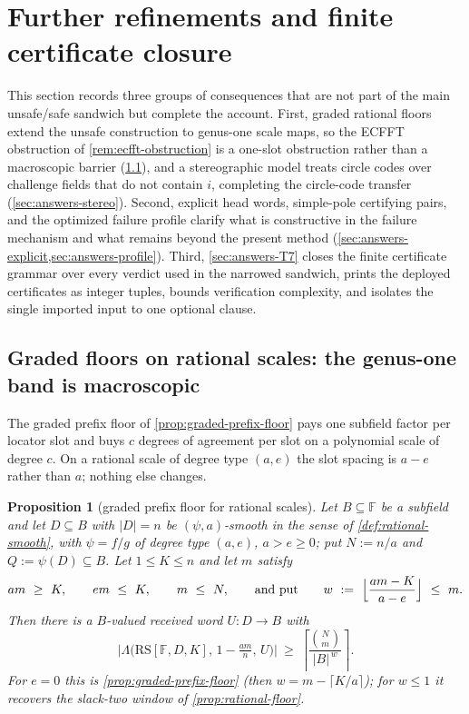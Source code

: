 \documentclass[11pt]{article}
\newtheorem{proposition}[proposition]{Proposition}
\theoremstyle{definition}
\theoremstyle{remark}
\newcommand{\F}{\mathbb{F}}
\newcommand{\B}{B}
\newcommand{\RS}{\mathrm{RS}}
\newcommand{\Lst}{\Lambda}
\begin{document}
\section{Further refinements and finite certificate closure}\label{sec:answers}

This section records three groups of consequences that are not part of the main unsafe/safe sandwich but complete the account.  First, graded rational floors extend the unsafe construction to genus-one scale maps, so the ECFFT obstruction of \cref{rem:ecfft-obstruction} is a one-slot obstruction rather than a macroscopic barrier (\cref{sec:answers-isogeny}), and a stereographic model treats circle codes over challenge fields that do not contain $i$, completing the circle-code transfer (\cref{sec:answers-stereo}).  Second, explicit head words, simple-pole certifying pairs, and the optimized failure profile clarify what is constructive in the failure mechanism and what remains beyond the present method (\cref{sec:answers-explicit,sec:answers-profile}).  Third, \cref{sec:answers-T7} closes the finite certificate grammar over every verdict used in the narrowed sandwich, prints the deployed certificates as integer tuples, bounds verification complexity, and isolates the single imported input to one optional clause.

\subsection{Graded floors on rational scales: the genus-one band is macroscopic}\label{sec:answers-isogeny}

The graded prefix floor of \cref{prop:graded-prefix-floor} pays one subfield factor per locator slot and buys $c$ degrees of agreement per slot on a polynomial scale of degree $c$. On a rational scale of degree type $(a,e)$ the slot spacing is $a-e$ rather than $a$; nothing else changes.

\begin{proposition}[graded prefix floor for rational scales]\label{prop:graded-rational-floor}
Let $\B\subseteq\F$ be a subfield and let $D\subseteq\B$ with $|D|=n$ be $(\psi,a)$-smooth in the sense of \cref{def:rational-smooth}, with $\psi=f/g$ of degree type $(a,e)$, $a>e\ge0$; put $N:=n/a$ and $Q:=\psi(D)\subseteq\B$. Let $1\le K\le n$ and let $m$ satisfy
\[
am\ \ge\ K,\qquad em\ \le\ K,\qquad m\ \le\ N,
\qquad\text{and put}\qquad
w\ :=\ \Bigl\lfloor\frac{am-K}{a-e}\Bigr\rfloor\ \le\ m .
\]
Then there is a $\B$-valued received word $U:D\to\B$ with
\[
\bigl|\Lst\bigl(\RS[\F,D,K],\,1-\tfrac{am}{n},\,U\bigr)\bigr|
\ \ge\
\left\lceil\frac{\binom Nm}{|\B|^{\,w}}\right\rceil .
\]
For $e=0$ this is \cref{prop:graded-prefix-floor} \textup(then $w=m-\lceil K/a\rceil$\textup); for $w\le1$ it recovers the slack-two window of \cref{prop:rational-floor}.
\end{proposition}
\end{document}
